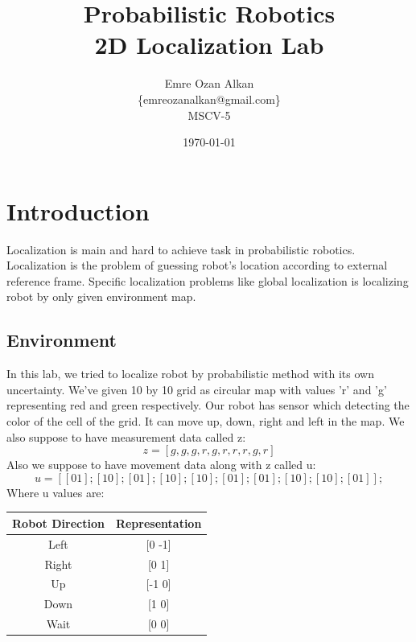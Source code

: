 \documentclass{article}
\title{Probabilistic Robotics\\
		2D Localization Lab}
\author{Emre Ozan Alkan\\
		\{emreozanalkan@gmail.com\}\\
		MSCV-5}
\date{\today}
\begin{document}
\maketitle








\section{Introduction}

	Localization is main and hard to achieve task in probabilistic robotics. Localization is the problem of guessing robot's location according to external reference frame. Specific localization problems like global localization is localizing robot by only given environment map.
	
	\subsection{Environment}
	In this lab, we tried to localize robot by probabilistic method with its own uncertainty. We've given 10 by 10 grid as circular map with values 'r' and 'g' representing red and green respectively. Our robot has sensor which detecting the color of the cell of the grid. It can move up, down, right and left in the map. We also suppose to have measurement data called z:
	$$ z = [g, g, g, r, g, r, r, r, g, r] $$
Also we suppose to have movement data along with z called u:
$$u = [[0 1];
     [1 0];
     [0 1];
     [1 0];
     [1 0];
     [0 1];
     [0 1];
     [1 0];
     [1 0];
     [0 1]];$$
Where u values are:

\begin{table}[h]
\centering
\begin{tabular}{|c|c|l|l|l|}
\hline
\textbf{Robot Direction} & \multicolumn{4}{|c|}{\textbf{Representation}} \\ \hline
Left                     & \multicolumn{4}{|c|}{{[}0 -1{]}}              \\ \hline
Right                    & \multicolumn{4}{|c|}{{[}0 1{]}}               \\ \hline
Up                       & \multicolumn{4}{|c|}{{[}-1 0{]}}              \\ \hline
Down                     & \multicolumn{4}{|c|}{{[}1 0{]}}               \\ \hline
Wait                     & \multicolumn{4}{|c|}{{[}0 0{]}}               \\ \hline
\end{tabular}
\end{table}
\end{document}
